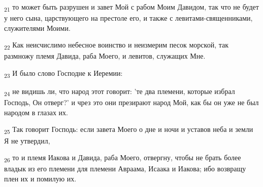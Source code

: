 \begin{tcolorbox}
\textsubscript{21} то может быть разрушен и завет Мой с рабом Моим Давидом, так что не будет у него сына, царствующего на престоле его, и также с левитами-священниками, служителями Моими.
\end{tcolorbox}
\begin{tcolorbox}
\textsubscript{22} Как неисчислимо небесное воинство и неизмерим песок морской, так размножу племя Давида, раба Моего, и левитов, служащих Мне.
\end{tcolorbox}
\begin{tcolorbox}
\textsubscript{23} И было слово Господне к Иеремии:
\end{tcolorbox}
\begin{tcolorbox}
\textsubscript{24} не видишь ли, что народ этот говорит: 'те два племени, которые избрал Господь, Он отверг?' и чрез это они презирают народ Мой, как бы он уже не был народом в глазах их.
\end{tcolorbox}
\begin{tcolorbox}
\textsubscript{25} Так говорит Господь: если завета Моего о дне и ночи и уставов неба и земли Я не утвердил,
\end{tcolorbox}
\begin{tcolorbox}
\textsubscript{26} то и племя Иакова и Давида, раба Моего, отвергну, чтобы не брать более владык из его племени для племени Авраама, Исаака и Иакова; ибо возвращу плен их и помилую их.
\end{tcolorbox}

